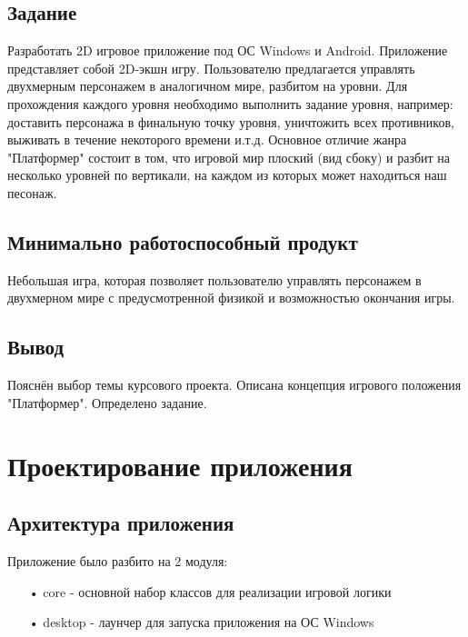 \subsection{Задание}

Разработать 2D игровое приложение под ОС Windows и Android. Приложение представляет собой 2D-экшн игру. Пользователю предлагается управлять двухмерным персонажем в аналогичном мире, разбитом на уровни. Для прохождения каждого уровня необходимо выполнить задание уровня, например: доставить персонажа в финальную точку уровня, уничтожить всех противников, выживать в течение некоторого времени и.т.д. Основное отличие жанра "Платформер" состоит в том, что игровой мир плоский (вид сбоку) и разбит на несколько уровней по вертикали, на каждом из которых может находиться наш песонаж.

\subsection{Минимально работоспособный продукт}

Небольшая игра, которая позволяет пользователю управлять персонажем в двухмерном мире с предусмотренной физикой и возможностью окончания игры. 

\subsection{Вывод}

Пояснён выбор темы курсового проекта. Описана концепция игрового положения "Платформер". Определено задание.


\section{Проектирование приложения}

\subsection{Архитектура приложения}

Приложение было разбито на 2 модуля:
\begin{enumerate}  
\item[•] core - основной набор классов для реализации игровой логики
\item[•] desktop - лаунчер для запуска приложения на ОС Windows
\end{enumerate}


